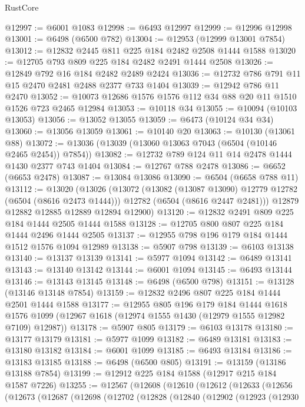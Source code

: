 \begin{lexlean}{RustCore}
\begin{coremodule}
@12997 := @6001 @1083
@12998 := @6493 @12997
@12999 := @12996 @12998
@13001 := @6498 (@6500 @782)
@13004 := @12953 (@12999 @13001 @7854)
@13012 := @12832 @2445 @811 @225 @184 @2482 @2508 @1444 @1588
@13020 := @12705 @793 @809 @225 @184 @2482 @2491 @1444 @2508
@13026 := @12849 @792 @16 @184 @2482 @2489 @2424
@13036 := @12732 @786 @791 @11 @15 @2470 @2481 @2488 @2377 @733 @1404
@13039 := @12942 @786 @11 @2470
@13052 := @10073 @12686 @1576 @1576 @112 @34 @88 @20 @11 @1510 @1526 @723 @2465 @12984
@13053 := @10118 @34
@13055 := @10094 (@10103 @13053)
@13056 := @13052 @13055
@13059 := @6473 (@10124 @34 @34)
@13060 := @13056 @13059
@13061 := @10140 @20
@13063 := @10130 (@13061 @88)
@13072 := @13036 (@13039 (@13060 @13063 @7043 (@6504 (@10146 @2465 @2454)) @7854))
@13082 := @12732 @789 @124 @11 @14 @2478 @1444 @1430 @2377 @743 @1404
@13084 := @12767 @788 @2478
@13086 := @6652 (@6653 @2478)
@13087 := @13084 @13086
@13090 := @6504 (@6658 @788 @11)
@13112 := @13020
    (@13026
      (@13072
        (@13082 (@13087 @13090) @12779 @12782 (@6504 (@8616 @2473 @1444)))
        @12782
        (@6504 (@8616 @2447 @2481)))
      @12879
      @12882
      @12885
      @12889
      @12894
      @12900)
@13120 := @12832 @2491 @809 @225 @184 @1444 @2505 @1444 @1588
@13128 := @12705 @800 @807 @225 @184 @1444 @2496 @1444 @2505
@13137 := @12955 @798 @196 @179 @184 @1444 @1512 @1576 @1094 @12989
@13138 := @5907 @798
@13139 := @6103 @13138
@13140 := @13137 @13139
@13141 := @5977 @1094
@13142 := @6489 @13141
@13143 := @13140 @13142
@13144 := @6001 @1094
@13145 := @6493 @13144
@13146 := @13143 @13145
@13148 := @6498 (@6500 @798)
@13151 := @13128 (@13146 @13148 @7854)
@13159 := @12832 @2496 @807 @225 @184 @1444 @2501 @1444 @1588
@13177 := @12955
    @805
    @196
    @179
    @184
    @1444
    @1618
    @1576
    @1099
    (@12967 @1618 (@12974 @1555 @1430 (@12979 @1555 @12982 @7109) @12987))
@13178 := @5907 @805
@13179 := @6103 @13178
@13180 := @13177 @13179
@13181 := @5977 @1099
@13182 := @6489 @13181
@13183 := @13180 @13182
@13184 := @6001 @1099
@13185 := @6493 @13184
@13186 := @13183 @13185
@13188 := @6498 (@6500 @805)
@13191 := @13159 (@13186 @13188 @7854)
@13199 := @12912 @225 @184 @1588 (@12917 @215 @184 @1587 @7226)
@13255 := @12567
    (@12608
      (@12610
        (@12612
          (@12633
            (@12656
              (@12673
                (@12687
                  (@12698
                    (@12702
                      (@12828
                        (@12840
                          (@12902
                            (@12923
                              (@12930

\end{coremodule}
\end{lexlean}
